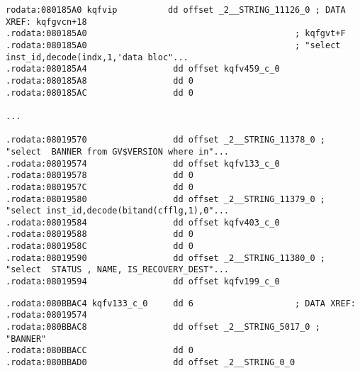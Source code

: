 \begin{lstlisting}[caption=kqf.o]
rodata:080185A0 kqfvip          dd offset _2__STRING_11126_0 ; DATA XREF: kqfgvcn+18
.rodata:080185A0                                         ; kqfgvt+F
.rodata:080185A0                                         ; "select inst_id,decode(indx,1,'data bloc"...
.rodata:080185A4                 dd offset kqfv459_c_0
.rodata:080185A8                 dd 0
.rodata:080185AC                 dd 0

...

.rodata:08019570                 dd offset _2__STRING_11378_0 ; "select  BANNER from GV$VERSION where in"...
.rodata:08019574                 dd offset kqfv133_c_0
.rodata:08019578                 dd 0
.rodata:0801957C                 dd 0
.rodata:08019580                 dd offset _2__STRING_11379_0 ; "select inst_id,decode(bitand(cfflg,1),0"...
.rodata:08019584                 dd offset kqfv403_c_0
.rodata:08019588                 dd 0
.rodata:0801958C                 dd 0
.rodata:08019590                 dd offset _2__STRING_11380_0 ; "select  STATUS , NAME, IS_RECOVERY_DEST"...
.rodata:08019594                 dd offset kqfv199_c_0
\end{lstlisting}


\begin{lstlisting}[caption=kqf.o]
.rodata:080BBAC4 kqfv133_c_0     dd 6                    ; DATA XREF: .rodata:08019574
.rodata:080BBAC8                 dd offset _2__STRING_5017_0 ; "BANNER"
.rodata:080BBACC                 dd 0
.rodata:080BBAD0                 dd offset _2__STRING_0_0
\end{lstlisting}

